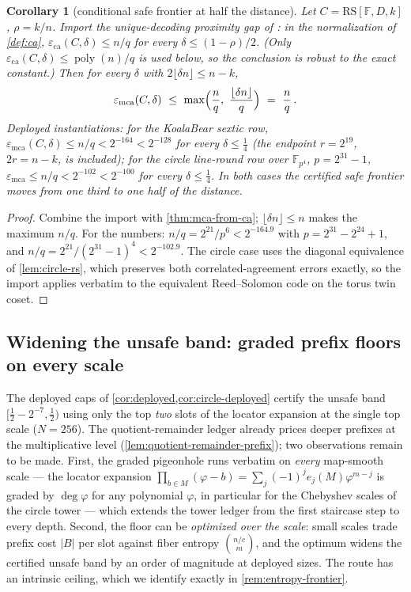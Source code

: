 \documentclass[11pt]{article}
\newtheorem{corollary}[corollary]{Corollary}
\theoremstyle{definition}
\theoremstyle{remark}
\newcommand{\F}{\mathbb{F}}
\newcommand{\B}{B}
\newcommand{\RS}{\mathrm{RS}}
\newcommand{\eca}{\varepsilon_{\mathrm{ca}}}
\newcommand{\emca}{\varepsilon_{\mathrm{mca}}}
\begin{document}
\begin{corollary}[conditional safe frontier at half the distance]\label{cor:conditional-half}
Let $C=\RS[\F,D,k]$, $\rho=k/n$. Import the unique-decoding proximity gap of \cite[Thm.~4.1]{BCIKS20}: in the normalization of \cref{def:ca}, $\eca(C,\delta)\le n/q$ for every $\delta\le(1-\rho)/2$. (Only $\eca(C,\delta)\le\operatorname{poly}(n)/q$ is used below, so the conclusion is robust to the exact constant.) Then for every $\delta$ with $2\lfloor\delta n\rfloor\le n-k$,
\[
\emca(C,\delta)\ \le\ \max\Bigl(\frac nq,\ \frac{\lfloor\delta n\rfloor}q\Bigr)\ =\ \frac nq\,.
\]
Deployed instantiations: for the KoalaBear sextic row, $\emca(C,\delta)\le n/q<2^{-164}<2^{-128}$ for every $\delta\le\tfrac14$ (the endpoint $r=2^{19}$, $2r=n-k$, is included); for the circle line-round row over $\F_{p^4}$, $p=2^{31}-1$, $\emca\le n/q<2^{-102}<2^{-100}$ for every $\delta\le\tfrac14$. In both cases the certified safe frontier moves from one third to one half of the distance.
\end{corollary}

\begin{proof}
Combine the import with \cref{thm:mca-from-ca}; $\lfloor\delta n\rfloor\le n$ makes the maximum $n/q$. For the numbers: $n/q=2^{21}/p^6<2^{-164.9}$ with $p=2^{31}-2^{24}+1$, and $n/q=2^{21}/(2^{31}-1)^4<2^{-102.9}$. The circle case uses the diagonal equivalence of \cref{lem:circle-rs}, which preserves both correlated-agreement errors exactly, so the import applies verbatim to the equivalent Reed--Solomon code on the torus twin coset.
\end{proof}

\subsection{Widening the unsafe band: graded prefix floors on every scale}\label{sec:pincer-floors}

The deployed caps of \cref{cor:deployed,cor:circle-deployed} certify the unsafe band $[\tfrac12-2^{-7},\tfrac12)$ using only the top \emph{two} slots of the locator expansion at the single top scale ($N=256$). The quotient-remainder ledger already prices deeper prefixes at the multiplicative level (\cref{lem:quotient-remainder-prefix}); two observations remain to be made. First, the graded pigeonhole runs verbatim on \emph{every} map-smooth scale --- the locator expansion $\prod_{b\in M}(\varphi-b)=\sum_j(-1)^je_j(M)\varphi^{m-j}$ is graded by $\deg\varphi$ for any polynomial $\varphi$, in particular for the Chebyshev scales of the circle tower --- which extends the tower ledger from the first staircase step to every depth. Second, the floor can be \emph{optimized over the scale}: small scales trade prefix cost $|\B|$ per slot against fiber entropy $\binom{n/c}{m}$, and the optimum widens the certified unsafe band by an order of magnitude at deployed sizes. The route has an intrinsic ceiling, which we identify exactly in \cref{rem:entropy-frontier}.
\end{document}
